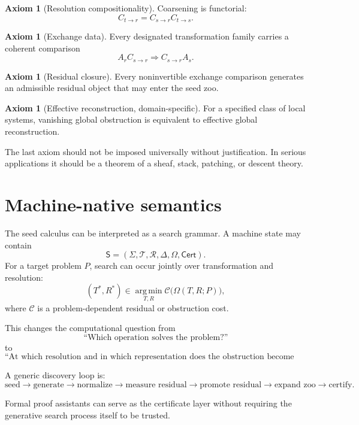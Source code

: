 \documentclass[11pt]{article}
\theoremstyle{definition}
\newtheorem{axiom}[theorem]{Axiom}
\theoremstyle{remark}
\newcommand{\Seeds}{\Sigma}
\begin{document}
\begin{axiom}[Resolution compositionality]
Coarsening is functorial:
\[
C_{t\to r}=C_{s\to r}C_{t\to s}.
\]
\end{axiom}

\begin{axiom}[Exchange data]
Every designated transformation family carries a coherent comparison
\[
A_rC_{s\to r}\Longrightarrow C_{s\to r}A_s.
\]
\end{axiom}

\begin{axiom}[Residual closure]
Every noninvertible exchange comparison generates an admissible residual object that may enter the seed zoo.
\end{axiom}

\begin{axiom}[Effective reconstruction, domain-specific]
For a specified class of local systems, vanishing global obstruction is equivalent to effective global reconstruction.
\end{axiom}

The last axiom should not be imposed universally without justification. In serious applications it should be a theorem of a sheaf, stack, patching, or descent theory.

\section{Machine-native semantics}

The seed calculus can be interpreted as a search grammar. A machine state may contain
\[
\mathsf S=
(\Seeds,\mathscr T,\mathscr R,\Delta,\Omega,\mathsf{Cert}).
\]
For a target problem $P$, search can occur jointly over transformation and resolution:
\[
(T^\ast,R^\ast)
\in
\operatorname*{arg\,min}_{T,R}
\mathcal C\bigl(\Omega(T,R;P)\bigr),
\]
where $\mathcal C$ is a problem-dependent residual or obstruction cost.

This changes the computational question from
\[
\text{``Which operation solves the problem?''}
\]
to
\[
\boxed{
\text{``At which resolution and in which representation does the obstruction become simplest?''}
}
\]

A generic discovery loop is:
\[
\boxed{
\text{seed}
\to
\text{generate}
\to
\text{normalize}
\to
\text{measure residual}
\to
\text{promote residual}
\to
\text{expand zoo}
\to
\text{certify}.
}
\]

Formal proof assistants can serve as the certificate layer without requiring the generative search process itself to be trusted.
\end{document}
